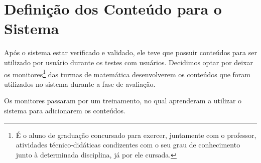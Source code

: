\section{Definição dos Conteúdo para o Sistema}

Após o sistema estar verificado e validado, ele teve que possuir conteúdos para ser utilizado por usu\'ario durante os testes com usu\'arios. Decidimos optar por deixar os monitores\footnote{É o aluno de graduação concursado para exercer, juntamente com o professor, atividades técnico-didáticas condizentes com o seu grau de conhecimento junto à determinada disciplina, já por ele cursada.} das turmas de matemática desenvolverem os conteúdos que foram utilizados no sistema durante a fase de avaliação. 

Os monitores passaram por um treinamento, no qual aprenderam a utilizar o sistema para adicionarem os conteúdos.